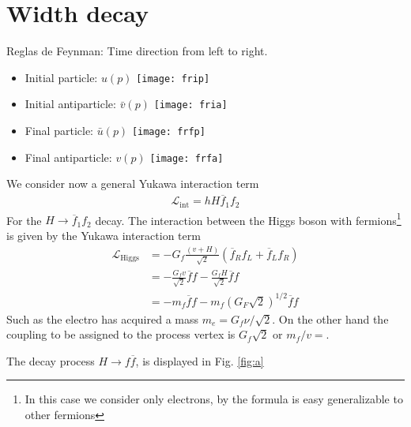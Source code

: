 \section{Width decay}
\label{sec:width-decay}

Reglas de Feynman: Time direction from left to right.
\begin{itemize}
\item Initial particle: ${u}(p)$ \texttt{[image: frip]}
\item Initial antiparticle: $\bar{v}(p)$ \texttt{[image: fria]}
\item Final particle: $\bar{u}(p)$ \texttt{[image: frfp]}
\item Final antiparticle: ${v}(p)$ \texttt{[image: frfa]}

\end{itemize}

We consider now a general Yukawa interaction term
\begin{align}
  \mathcal{L}_{\text{int}}=hH\overline{f}_1 f_2
\end{align}
For the $H\to \overline{f}_1f_2$ decay.
The interaction between the Higgs boson with fermions\footnote{In this case we consider only electrons, by the formula is easy generalizable to other fermions} is given by the Yukawa interaction term \cite{lsm}
\begin{align}
\label{eq:155}
\mathcal{L}_{\text{Higgs}}&=-G_{f}\frac{(v+H)}{\sqrt{2}}(\overline{f}_{R}f_{L}+\overline{f}_{L}f_{R})\nonumber\\
&=-\frac{G_{f}v}{\sqrt{2}}\overline{f}f-\frac{G_{f}H}{\sqrt{2}}\overline{f}f\nonumber\\
&=-m_f\overline{f}f-m_f\left(G_{F}\sqrt{2}\right)^{1/2}\overline{f}f
\end{align}
Such as the electro has acquired a mass $m_{e}=G_{f}\nu/\sqrt{2}$. On the other hand the coupling to be assigned to the process vertex is 
$G_{f}\sqrt{2}$ or $m_{f}/v=$. 

The decay process $H\to f\overline{f}$, is displayed in Fig. 
\ref{fig:a} %

